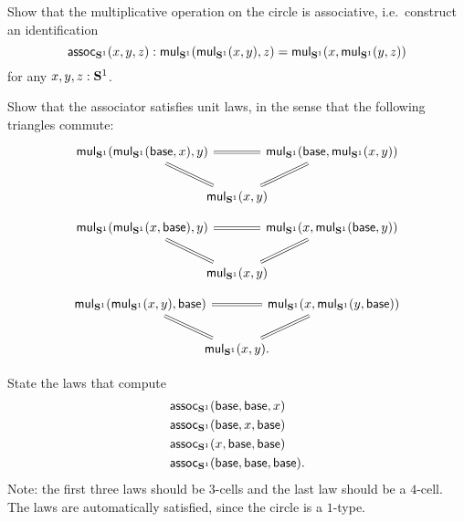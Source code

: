 \begin{exercises}
  \exercise
  \begin{subexenum}
  \item Show that the multiplicative operation on the circle is associative, i.e.~construct an identification
    \begin{equation*}
      \mathsf{assoc}_{\mathbf{S}^{1}}(x,y,z) :
      \mathsf{mul}_{\mathbf{S}^{1}}(\mathsf{mul}_{\mathbf{S}^{1}}(x,y),z)=\mathsf{mul}_{\mathbf{S}^{1}}(x,\mathsf{mul}_{\mathbf{S}^{1}}(y,z))
    \end{equation*}
    for any $x,y,z:\mathbf{S}^{1}$.
  \item Show that the associator satisfies unit laws, in the sense that the following triangles commute:
    \begin{equation*}
      \begin{tikzcd}[column sep=-1em]
        \mulcircle(\mulcircle(\base,x),y) \arrow[rr,equals] \arrow[dr,equals] & & \mulcircle(\base,\mulcircle(x,y)) \arrow[dl,equals] \\
        & \mulcircle(x,y)
      \end{tikzcd}
    \end{equation*}
    \begin{equation*}
      \begin{tikzcd}[column sep=-1em]
        \mulcircle(\mulcircle(x,\base),y) \arrow[rr,equals] \arrow[dr,equals] & & \mulcircle(x,\mulcircle(\base,y)) \arrow[dl,equals] \\
        & \mulcircle(x,y)
      \end{tikzcd}
    \end{equation*}
    \begin{equation*}
      \begin{tikzcd}[column sep=-1em]
        \mulcircle(\mulcircle(x,y),\base) \arrow[rr,equals] \arrow[dr,equals] & & \mulcircle(x,\mulcircle(y,\base)) \arrow[dl,equals] \\
        & \mulcircle(x,y).
      \end{tikzcd}
    \end{equation*}
  \item State the laws that compute
    \begin{align*}
      & \mathsf{assoc}_{\mathbf{S}^{1}}(\mathsf{base},\mathsf{base},x) \\
      & \mathsf{assoc}_{\mathbf{S}^{1}}(\mathsf{base},x,\mathsf{base}) \\
      & \mathsf{assoc}_{\mathbf{S}^{1}}(x,\mathsf{base},\mathsf{base}) \\
      & \mathsf{assoc}_{\mathbf{S}^{1}}(\mathsf{base},\mathsf{base},\mathsf{base}).
    \end{align*}
    Note: the first three laws should be $3$-cells and the last law should be a $4$-cell. The laws are automatically satisfied, since the circle is a $1$-type.

\end{subexenum}
\end{exercises}
